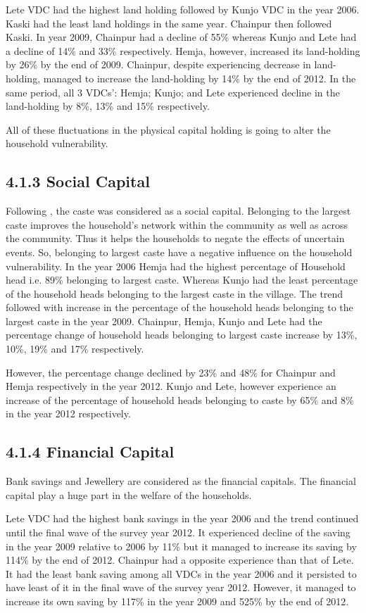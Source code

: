 \documentclass[12pt, a4paper]{article}
\begin{document}
Lete VDC had the highest land holding followed by Kunjo VDC in the year 2006. Kaski had the least land holdings in the same year. Chainpur then followed Kaski. In year 2009, Chainpur had a decline of 55\% whereas Kunjo and Lete had a decline of 14\% and 33\% respectively. Hemja, however, increased its land-holding by 26\% by the end of 2009. Chainpur, despite experiencing decrease in land-holding, managed to increase the land-holding by 14\% by the end of 2012. In the same period, all 3 VDCs': Hemja; Kunjo; and Lete experienced decline in the land-holding by 8\%, 13\% and 15\% respectively. 

All of these fluctuations in the physical capital holding is going to alter the household vulnerability.  

\subsection*{4.1.3 Social Capital}  
Following \cite{alha2018other, vanneman2006social}, the caste was considered as a social capital. Belonging to the largest caste improves the household's network within the community as well as across the community. Thus it helps the households to negate the effects of uncertain events. So, belonging to largest caste have a negative influence on the household vulnerability. In the year 2006 Hemja had the highest percentage of Household head i.e. 89\% belonging to largest caste. Whereas Kunjo had the least percentage of the household heads belonging to the largest caste in the village. The trend followed with increase in the percentage of the household heads belonging to the largest caste in the year 2009. Chainpur, Hemja, Kunjo and Lete had the percentage change of household heads belonging to largest caste increase by 13\%, 10\%, 19\% and 17\% respectively. 

However, the percentage change declined by 23\% and 48\% for Chainpur and Hemja respectively in the year 2012. Kunjo and Lete, however experience an increase of the percentage of household heads belonging to caste by 65\% and 8\% in the year 2012 respectively. 

\subsection*{4.1.4 Financial Capital}
Bank savings and Jewellery are considered as the financial capitals. The financial capital play a huge part in the welfare of the households. 

Lete VDC had the highest bank savings in the year 2006 and the trend continued until the final wave of the survey year 2012. It experienced decline of the saving in the year 2009 relative to 2006 by 11\% but it managed to increase its saving by 114\% by the end of 2012. Chainpur had a opposite experience than that of Lete. It had the least bank saving among all VDCs in the year 2006 and it persisted to have least of it in the final wave of the survey year 2012. However, it managed to increase its own saving by 117\% in the year 2009 and 525\% by the end of 2012. 
\end{document}
